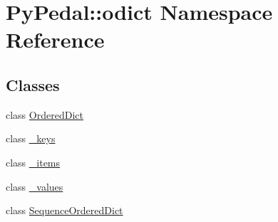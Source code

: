 \hypertarget{namespacePyPedal_1_1odict}{
\section{PyPedal::odict Namespace Reference}
\label{namespacePyPedal_1_1odict}
}


\subsection*{Classes}
\begin{CompactItemize}
\item 
class \hyperlink{classPyPedal_1_1odict_1_1OrderedDict}{OrderedDict}
\item 
class \hyperlink{classPyPedal_1_1odict_1_1__keys}{\_\-keys}
\item 
class \hyperlink{classPyPedal_1_1odict_1_1__items}{\_\-items}
\item 
class \hyperlink{classPyPedal_1_1odict_1_1__values}{\_\-values}
\item 
class \hyperlink{classPyPedal_1_1odict_1_1SequenceOrderedDict}{SequenceOrderedDict}
\end{CompactItemize}
